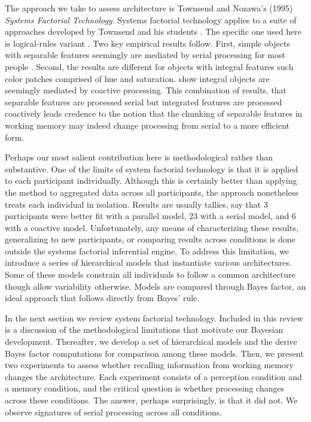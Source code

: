 \documentclass[fignum,nobf,man]{apa}
\begin{document}
The approach we take to assess architecture is Townsend and Nozawa's (1995) {\em Systems  Factorial Technology}.   Systems factorial technology applies to a suite of approaches developed by Townsend and his students  \citep[see][for a review]{Townsend:Wenger:2004}.  The specific one used here is logical-rules variant \citep{Fific:etal:2008}.  Two key empirical results follow.  First,  simple objects with separable features seemingly are mediated by serial processing for most people \citep{Fific:etal:2010,Little:etal:2011}.  Second, the results are different for objects with integral features such color patches comprised of hue and saturation.   \citet{Little:etal:2013} show integral objects are seemingly mediated by coactive processing.  This combination of results, that separable features are processed serial but integrated features are processed coactively leads credence to the notion that the chunking of separable features in working memory may indeed change processing from serial to a more efficient form.  

Perhaps our most salient contribution here is methodological rather than substantive.  One of the limits of system factorial technology is that it is  applied to each participant individually.  Although this is certainly better than applying the method to aggregated data across all participants, the approach nonetheless treats each individual in isolation.  Results are usually tallies, say that 3 participants were better fit with a parallel model, 23 with a serial model, and 6 with a coactive model.  Unfortunately, any means of characterizing these results, generalizing to new participants, or comparing results across conditions is done outside the systems factorial inferential engine.  To address this limitation, we introduce a series of hierarchical models that instantiate various architectures.  Some of these models constrain all individuals to follow a common architecture though allow variability otherwise.  Models are compared through Bayes factor, an ideal approach  that follows directly from Bayes' rule.

In the next section we review system factorial technology. Included in this review is a discussion of the methodological limitations that motivate our Bayesian development.   Thereafter, we develop a set of hierarchical models and the derive Bayes factor computations for comparison among these models.  Then, we present two experiments to assess whether recalling information from working memory changes the architecture.  Each experiment consists of a perception condition and a memory condition, and the critical question is whether processing changes across these conditions.  The answer, perhaps surprisingly, is that it did not.  We observe signatures of serial processing across all conditions.
 
\end{document}
